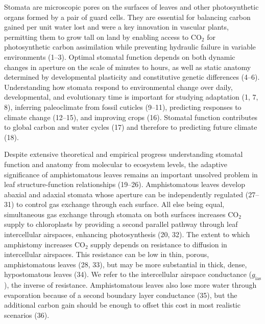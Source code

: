 \documentclass[
  letterpaper,
  DIV=11,
  numbers=noendperiod]{scrartcl}
\newcommand{\gias}{$g_\text{ias}$}
\begin{document}
\begin{linenumbers}
\begin{doublespace}
Stomata are microscopic pores on the surfaces of leaves and other
photosynthetic organs formed by a pair of guard cells. They are
essential for balancing carbon gained per unit water lost and were a key
innovation in vascular plants, permitting them to grow tall on land by
enabling access to CO\(_2\) for photosynthetic carbon assimilation while
preventing hydraulic failure in variable environments (1--3). Optimal
stomatal function depends on both dynamic changes in aperture on the
scale of minutes to hours, as well as static anatomy determined by
developmental plasticity and constitutive genetic differences (4--6).
Understanding how stomata respond to environmental change over daily,
developmental, and evolutionary time is important for studying
adaptation (1, 7, 8), inferring paleoclimate from fossil cuticles
(9--11), predicting responses to climate change (12--15), and improving
crops (16). Stomatal function contributes to global carbon and water
cycles (17) and therefore to predicting future climate (18).

Despite extensive theoretical and empirical progress understanding
stomatal function and anatomy from molecular to ecosystem levels, the
adaptive significance of amphistomatous leaves remains an important
unsolved problem in leaf structure-function relationships (19--26).
Amphistomatous leaves develop abaxial and adaxial stomata whose aperture
can be independently regulated (27--31) to control gas exchange through
each surface. All else being equal, simultaneous gas exchange through
stomata on both surfaces increases CO\(_2\) supply to chloroplasts by
providing a second parallel pathway through leaf intercellular
airspaces, enhancing photosynthesis (20, 32). The extent to which
amphistomy increases CO\(_2\) supply depends on resistance to diffusion
in intercellular airspaces. This resistance can be low in thin, porous,
amphistomatous leaves (28, 33), but may be more substantial in thick,
dense, hypostomatous leaves (34). We refer to the intercellular airspace
conductance (\gias), the inverse of resistance. Amphistomatous leaves
also lose more water through evaporation because of a second boundary
layer conductance (35), but the additional carbon gain should be enough
to offset this cost in most realistic scenarios (36).


\end{doublespace}
\end{linenumbers}
\end{document}
